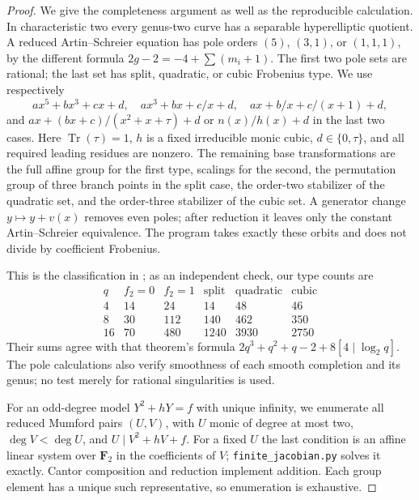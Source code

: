 \documentclass[11pt]{article}
\begin{document}
\begin{proof}
We give the completeness argument as well as the reproducible
calculation.  In characteristic two every genus-two curve has a
separable hyperelliptic quotient.  A reduced Artin--Schreier equation
has pole orders $(5)$, $(3,1)$, or $(1,1,1)$, by the different formula
$2g-2=-4+\sum(m_i+1)$.  The first two pole sets are rational; the
last set has split, quadratic, or cubic Frobenius type.  We use
respectively
\[
 ax^5+bx^3+cx+d,\quad ax^3+bx+c/x+d,\quad
 ax+b/x+c/(x+1)+d,
\]
and $ax+(bx+c)/(x^2+x+\tau)+d$ or $n(x)/h(x)+d$ in the last
two cases.  Here $\operatorname{Tr}(\tau)=1$, $h$ is a fixed
irreducible monic cubic, $d\in\{0,\tau\}$, and all required
leading residues are nonzero.  The remaining base transformations
are the full affine group for the first type, scalings for the
second, the permutation group of three branch points in the split
case, the order-two stabilizer of the quadratic set, and the
order-three stabilizer of the cubic set.  A generator change
$y\mapsto y+v(x)$ removes even poles; after reduction it leaves
only the constant Artin--Schreier equivalence.  The program takes
exactly these orbits and does not divide by coefficient Frobenius.

This is the classification in \cite[Propositions~8--16,
Theorem~17]{AR_CNP2005}; as an independent check, our type counts are
\[
\begin{array}{c|rrrrr}
q&f_2=0&f_2=1&\text{split}&\text{quadratic}&\text{cubic}\\\hline
4&14&24&14&48&46\\
8&30&112&140&462&350\\
16&70&480&1240&3930&2750
\end{array}
\]
Their sums agree with that theorem's formula
$2q^3+q^2+q-2+8[4\mid\log_2q]$.  The pole calculations also verify
smoothness of each smooth completion and its genus; no test merely
for rational singularities is used.

For an odd-degree model $Y^2+hY=f$ with unique infinity, we enumerate
all reduced Mumford pairs $(U,V)$, with $U$ monic of degree at most
two, $\deg V<\deg U$, and
$U\mid V^2+hV+f$.  For a fixed $U$ the last condition is an affine
linear system over $\mathbf F_2$ in the coefficients of $V$;
\texttt{finite\_jacobian.py} solves it exactly.  Cantor composition
and reduction implement addition.  Each group element has a unique
such representative, so enumeration is exhaustive.


\end{proof}
\end{document}
